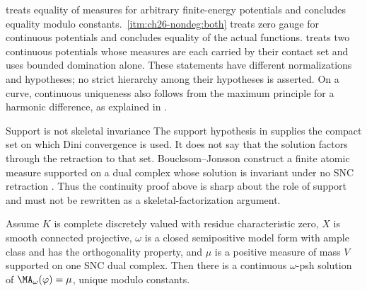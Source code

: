 \begin{remark}
\label{rem:ch29-uniqueness-ladder}
 treats equality of measures for arbitrary
finite-energy potentials and concludes equality modulo constants.
\,\cref{itm:ch26-nondeg:both}
treats zero gauge for continuous potentials and concludes equality of the
actual functions.   treats two
continuous potentials whose measures are each carried by their contact
set and uses bounded domination alone.  These statements have different
normalizations and hypotheses; no strict hierarchy among their
hypotheses is asserted.  On a curve, continuous uniqueness also follows
from the maximum principle for a harmonic difference, as explained in
.
\end{remark}

\begin{warning}{Support is not skeletal invariance}
\label{warn:ch29-support-not-skeletal}
The support hypothesis in  supplies the
compact set on which Dini convergence is used.  It does not say that the
solution factors through the retraction to that set.  Boucksom--Jonsson
construct a finite atomic measure supported on a dual complex whose solution
is invariant under no SNC retraction \cite[Theorem~B]{BJGreen24}.  Thus the
continuity proof above is sharp about the role of support and must not be
rewritten as a skeletal-factorization argument.
\end{warning}

\begin{corollary}\label{cor:bfj-original-continuous-solution}
Assume $K$ is complete discretely valued with residue characteristic zero,
$X$ is smooth connected projective, $\omega$ is a closed semipositive
model form with ample class and
has the orthogonality property, and $\mu$ is a positive measure of mass
$V$ supported on one SNC dual complex.  Then there is a continuous
$\omega$-psh solution of $\MA_\omega(\varphi)=\mu$, unique modulo
constants.
\end{corollary}

